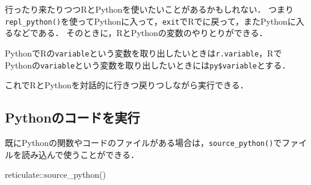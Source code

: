 \documentclass[
]{article}
\newenvironment{Shaded}{\begin{snugshade}}{\end{snugshade}}
\newcommand{\AttributeTok}[1]{\textcolor[rgb]{0.77,0.63,0.00}{#1}}
\newcommand{\CommentTok}[1]{\textcolor[rgb]{0.56,0.35,0.01}{\textit{#1}}}
\newcommand{\ConstantTok}[1]{\textcolor[rgb]{0.00,0.00,0.00}{#1}}
\newcommand{\DocumentationTok}[1]{\textcolor[rgb]{0.56,0.35,0.01}{\textbf{\textit{#1}}}}
\newcommand{\ErrorTok}[1]{\textcolor[rgb]{0.64,0.00,0.00}{\textbf{#1}}}
\newcommand{\FunctionTok}[1]{\textcolor[rgb]{0.00,0.00,0.00}{#1}}
\newcommand{\NormalTok}[1]{#1}
\newcommand{\OtherTok}[1]{\textcolor[rgb]{0.56,0.35,0.01}{#1}}
\newcommand{\SpecialCharTok}[1]{\textcolor[rgb]{0.00,0.00,0.00}{#1}}
\newcommand{\StringTok}[1]{\textcolor[rgb]{0.31,0.60,0.02}{#1}}
\begin{document}
行ったり来たりつつRとPythonを使いたいことがあるかもしれない．
つまり\texttt{repl\_python()}を使ってPythonに入って，\texttt{exit}でRでに戻って，またPythonに入るなどである．
そのときに，RとPythonの変数のやりとりができる．

PythonでRの\texttt{variable}という変数を取り出したいときは\texttt{r.variable}，RでPythonの\texttt{variable}という変数を取り出したいときには\texttt{py\$variable}とする．

\begin{Shaded}
\end{Shaded}

これでRとPythonを対話的に行きつ戻りつしながら実行できる．

\begin{Shaded}
\end{Shaded}

\hypertarget{pythonux306eux30b3ux30fcux30c9ux3092ux5b9fux884c}{%
\subsection{Pythonのコードを実行}\label{pythonux306eux30b3ux30fcux30c9ux3092ux5b9fux884c}}

既にPythonの関数やコードのファイルがある場合は，\texttt{source\_python()}でファイルを読み込んで使うことができる．

\begin{Shaded}
\begin{Highlighting}[]
\NormalTok{reticulate}\SpecialCharTok{::}\FunctionTok{source\_python}\NormalTok{()}
\end{Highlighting}
\end{Shaded}
\end{document}
